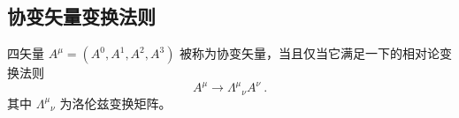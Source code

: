 

\subsection{协变矢量变换法则}
四矢量 $A^\mu=(A^0,A^1,A^2,A^3)$ 被称为协变矢量，当且仅当它满足一下的相对论变换法则
\begin{equation}
A^\mu\rightarrow \Lambda^{\mu}{}_\nu A^\nu~.
\end{equation}
其中 $\Lambda^\mu{}_\nu$ 为洛伦兹变换矩阵。